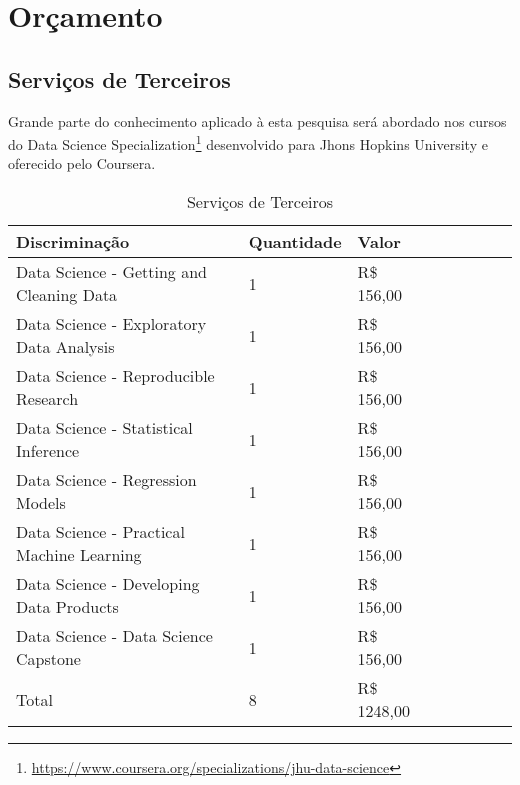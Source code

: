 \chapter[Orçamento]{Orçamento}

\section{Serviços de Terceiros}\label{sec-servTerc}
  Grande parte do conhecimento aplicado à esta pesquisa será abordado nos 
cursos do Data Science 
Specialization\footnote{\url{
https://www.coursera.org/specializations/jhu-data-science}} desenvolvido para 
Jhons Hopkins University e oferecido pelo Coursera.


\begin{table}[htb]
  \centering
  \caption[Serviços de Terceiros]{Serviços de Terceiros}
  \label{tabCrono}
  \begin{tabular}{llllllll}
    \textbf{Discriminação}                    			& 
\textbf{Quantidade} & \textbf{Valor}  \\
    \hline
    Data Science - Getting and Cleaning Data	& 1   & R\$ 156,00 \\
    Data Science - Exploratory Data Analysis  	& 1   & R\$ 156,00 \\
    Data Science - Reproducible Research  	& 1   & R\$ 156,00 \\
    Data Science - Statistical Inference	& 1   & R\$ 156,00 \\
    Data Science - Regression Models		& 1   & R\$ 156,00 \\
    Data Science - Practical Machine Learning	& 1   & R\$ 156,00 \\
    Data Science - Developing Data Products	& 1   & R\$ 156,00 \\
    Data Science - Data Science Capstone	& 1   & R\$ 156,00 \\
    \hline
    Total					& 8   & R\$ 1248,00 \\
    \hline
  \end{tabular}
\end{table}